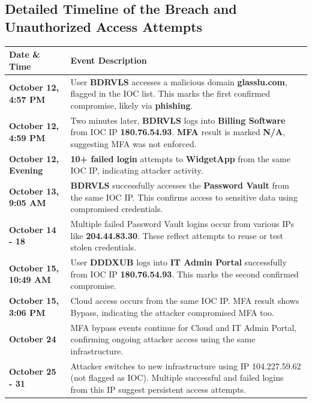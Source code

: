 \documentclass[11pt]{article}
\begin{document}
	\subsection{Detailed Timeline of the Breach and Unauthorized Access Attempts}
	\renewcommand{\arraystretch}{1.8}
	\begin{table}[ht]
		\begin{tabular}{|p{3.6cm}|p{12.6cm}|}
			\hline
			\textbf{Date \& Time} & \textbf{Event Description} \\
			\hline
			\textbf{October 12, 4:57 PM} & User \textbf{BDRVLS} accesses a malicious domain \textbf{glasslu.com}, flagged in the IOC list. This marks the first confirmed compromise, likely via \textbf{phishing}.\\
			\hline
			\textbf{October 12, 4:59 PM} & Two minutes later, \textbf{BDRVLS} logs into \textbf{Billing Software} from IOC IP \textbf{180.76.54.93}. \textbf{MFA} result is marked \textbf{N/A}, suggesting MFA was not enforced.\\
			\hline
			\textbf{October 12, Evening} & \textbf{10+ failed login} attempts to \textbf{WidgetApp} from the same IOC IP, indicating attacker activity.\\
			\hline
			\textbf{October 13, 9:05 AM} & \textbf{BDRVLS} successfully accesses the \textbf{Password Vault} from the same IOC IP. This confirms access to sensitive data using compromised credentials.\\
			\hline
			\textbf{October 14 - 18} & Multiple failed Password Vault logins occur from various IPs like \textbf{204.44.83.30}. These reflect attempts to reuse or test stolen credentials.\\
			\hline
			\textbf{October 15, 10:49 AM} & User \textbf{DDDXUB} logs into \textbf{IT Admin Portal} successfully from IOC IP \textbf{180.76.54.93}. This marks the second confirmed compromise.\\
			\hline
			\textbf{October 15, 3:06 PM} & Cloud access occurs from the same IOC IP. MFA result shows Bypass, indicating the attacker compromised MFA too.\\
			\hline
			\textbf{October 24} & MFA bypass events continue for Cloud and IT Admin Portal, confirming ongoing attacker access using the same infrastructure.\\
			\hline
			\textbf{October 25 - 31} & Attacker switches to new infrastructure using IP 104.227.59.62 (not flagged as IOC). Multiple successful and failed logins from this IP suggest persistent access attempts.\\
			\hline
		\end{tabular}
		\label{tab:timeline}
	\end{table}
	
\end{document}
